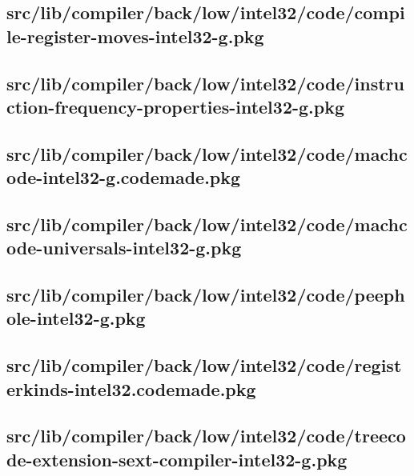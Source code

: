 \subsection{src/lib/compiler/back/low/intel32/code/compile-register-moves-intel32-g.pkg}


\subsection{src/lib/compiler/back/low/intel32/code/instruction-frequency-properties-intel32-g.pkg}


\subsection{src/lib/compiler/back/low/intel32/code/machcode-intel32-g.codemade.pkg}


\subsection{src/lib/compiler/back/low/intel32/code/machcode-universals-intel32-g.pkg}


\subsection{src/lib/compiler/back/low/intel32/code/peephole-intel32-g.pkg}


\subsection{src/lib/compiler/back/low/intel32/code/registerkinds-intel32.codemade.pkg}


\subsection{src/lib/compiler/back/low/intel32/code/treecode-extension-sext-compiler-intel32-g.pkg}


